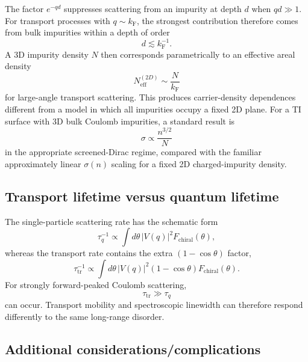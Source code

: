 \documentclass[11pt]{article}
\newcommand{\kF}{k_{\mathrm F}}
\begin{document}
The factor $e^{-qd}$ suppresses scattering from an impurity at depth $d$ when $qd\gg1$. For transport processes with $q\sim\kF$, the strongest contribution therefore comes from bulk impurities within a depth of order
\begin{equation}
    d\lesssim \kF^{-1}.
\end{equation}
A 3D impurity density $N$ then corresponds parametrically to an effective areal density
\begin{equation}
    N_{\mathrm{eff}}^{(2D)}\sim\frac{N}{\kF}
\end{equation}
for large-angle transport scattering. This produces carrier-density dependences different from a model in which all impurities occupy a fixed 2D plane. For a TI surface with 3D bulk Coulomb impurities, a standard result is
\begin{equation}
    \sigma\propto\frac{n^{3/2}}{N}
\end{equation}
in the appropriate screened-Dirac regime, compared with the familiar approximately linear $\sigma(n)$ scaling for a fixed 2D charged-impurity density.

\subsection*{Transport lifetime versus quantum lifetime}

The single-particle scattering rate has the schematic form
\begin{equation}
    \tau_q^{-1}
    \propto
    \int d\theta\,|V(q)|^2F_{\mathrm{chiral}}(\theta),
\end{equation}
whereas the transport rate contains the extra $(1-\cos\theta)$ factor,
\begin{equation}
    \tau_{\mathrm{tr}}^{-1}
    \propto
    \int d\theta\,|V(q)|^2(1-\cos\theta)
    F_{\mathrm{chiral}}(\theta).
\end{equation}
For strongly forward-peaked Coulomb scattering,
\begin{equation}
    \tau_{\mathrm{tr}}\gg\tau_q
\end{equation}
can occur. Transport mobility and spectroscopic linewidth can therefore respond differently to the same long-range disorder.

\subsection*{Additional considerations/complications}
\end{document}
